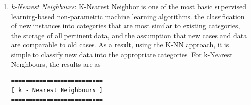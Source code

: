 \documentclass[sn-basic]{sn-jnl}%
\theoremstyle{thmstyleone}%
\theoremstyle{thmstyletwo}%
\theoremstyle{thmstylethree}%
\begin{document}
\begin{enumerate}
\begin{figure}[!h]
{or attributes are absent) is 110, and True Negative (An accurate test result that shows the absence of a condition or trait) is 22.}
\label{Fig. 5}
\end{figure}
\item \textit{k-Nearest Neighbours}: K-Nearest Neighbor is one of the most basic supervised learning-based non-parametric machine learning algorithms. the classification of new instances into categories that are most similar to existing categories, the storage of all pertinent data, and the assumption that new cases and data are comparable to old cases. As a result, using the K-NN approach, it is simple to classify new data into the appropriate categories. For k-Nearest Neighbours, the results are as
\begin{verbatim}
==========================
[ k - Nearest Neighbours ]
==========================


\end{verbatim}
\end{enumerate}
\end{document}
